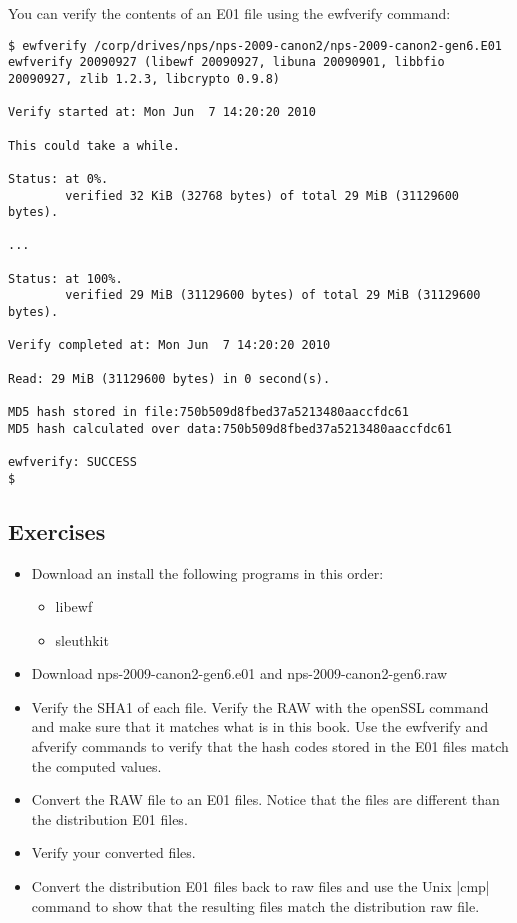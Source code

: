 You can verify the contents of an E01 file using the ewfverify
command:

\begin{Verbatim}
$ ewfverify /corp/drives/nps/nps-2009-canon2/nps-2009-canon2-gen6.E01 
ewfverify 20090927 (libewf 20090927, libuna 20090901, libbfio
20090927, zlib 1.2.3, libcrypto 0.9.8)

Verify started at: Mon Jun  7 14:20:20 2010

This could take a while.

Status: at 0%.
        verified 32 KiB (32768 bytes) of total 29 MiB (31129600 bytes).

...

Status: at 100%.
        verified 29 MiB (31129600 bytes) of total 29 MiB (31129600 bytes).

Verify completed at: Mon Jun  7 14:20:20 2010

Read: 29 MiB (31129600 bytes) in 0 second(s).

MD5 hash stored in file:750b509d8fbed37a5213480aaccfdc61
MD5 hash calculated over data:750b509d8fbed37a5213480aaccfdc61

ewfverify: SUCCESS
$ 
\end{Verbatim}




\subsection{Exercises}
\begin{itemize}
\item Download an install the following programs in this order:
\begin{itemize}
\item   libewf
\item  sleuthkit
\end{itemize}
\item Download nps-2009-canon2-gen6.e01 and nps-2009-canon2-gen6.raw
\item Verify the SHA1 of each file. Verify the RAW with the openSSL
  command and make sure that it matches what is in this book. Use the
  ewfverify and afverify commands to verify that the hash codes stored
  in the E01 files match the computed values.
\item Convert the RAW file to an E01 files. Notice that the
  files are different than the distribution E01 files.
\item Verify your converted files.
\item Convert the distribution E01 files back to raw files and
  use the Unix |cmp| command to show that the resulting files match
  the distribution raw file.
\end{itemize}


